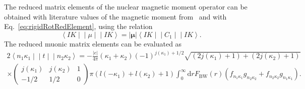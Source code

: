 The reduced matrix elements of the nuclear magnetic moment operator can be obtained with literature values of the magnetic moment  from~\cite{Stone2005} and with Eq.~\eqref{eq:rigidRotRedElement}, using the relation
\begin{equation}
\left< IK\middle|\middle|\mu \middle|\middle|IK\right> =
|\mathbf{\mu}| \left< IK\middle|\middle|C_1 \middle|\middle|IK\right>.
\end{equation}
The reduced muonic matrix elements can be evaluated as~\cite{johnson2007}
\begin{alignat}{2}
\left< n_1\kappa_1\middle|\middle|t \middle|\middle| n_2\kappa_2\right> = -\frac{|e|}{4\pi}(\kappa_1+\kappa_2)(-1)^{j(\kappa_1)+1/2}\sqrt{(2j(\kappa_1)+1)+(2j(\kappa_2)+1)}\qquad\quad\;\\[7.5pt]
\times
\begin{pmatrix}
j(\kappa_1)&j(\kappa_2)&1\\
-1/2&1/2&0
\end{pmatrix}
\pi(l(-\kappa_1)+l(\kappa_2)+1)\int_0^\infty \text{d}r F_{\text{BW}}(r)\left(f_{n_1\kappa_1}g_{n_2\kappa_2}+f_{n_2\kappa_2}g_{n_1\kappa_1} \right).
\end{alignat}

